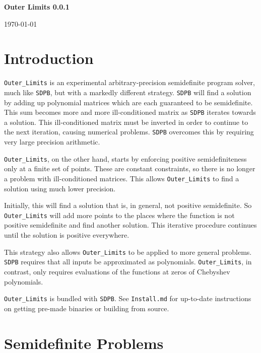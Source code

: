 \documentclass[12pt]{article}
\numberwithin{equation}{section}
\begin{document}
{\Large
\begin{center}
{\bf Outer Limits 0.0.1 \\\vspace{.1in}}
\end{center}
}
\begin{center}
\noindent \today
\end{center}
\tableofcontents
\section{Introduction}
\label{sec:introduction}

\texttt{Outer\_Limits} is an experimental arbitrary-precision
semidefinite program solver, much like \texttt{SDPB}, but with a
markedly different strategy.  \texttt{SDPB} will find a solution by
adding up polynomial matrices which are each guaranteed to be
semidefinite.  This sum becomes more and more ill-conditioned matrix
as \texttt{SDPB} iterates towards a solution.  This ill-conditioned
matrix must be inverted in order to continue to the next iteration,
causing numerical problems.  \texttt{SDPB} overcomes this by requiring
very large precision arithmetic.

\texttt{Outer\_Limits}, on the other hand, starts by enforcing positive
semidefiniteness only at a finite set of points.  These are constant
constraints, so there is no longer a problem with ill-conditioned
matrices.  This allows \texttt{Outer\_Limits} to find a solution using
much lower precision.

Initially, this will find a solution that is, in general, not positive
semidefinite.  So \texttt{Outer\_Limits} will add more points to the
places where the function is not positive semidefinite and find
another solution.  This iterative procedure continues until the
solution is positive everywhere.

This strategy also allows \texttt{Outer\_Limits} to be applied to more
general problems.  \texttt{SDPB} requires that all inputs be
approximated as polynomials.  \texttt{Outer\_Limits}, in contrast, only requires
evaluations of the functions at zeros of Chebyshev polynomials.

\texttt{Outer\_Limits} is bundled with \texttt{SDPB}.  See
\texttt{Install.md} for up-to-date instructions on getting pre-made
binaries or building from source.

\section{Semidefinite Problems}
\label{sec:semidefinite}
\end{document}

